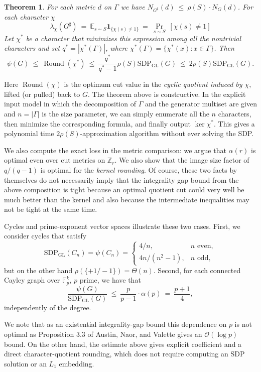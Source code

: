 \documentclass[11pt]{article}
\newtheorem{theorem}{Theorem}[section]
\theoremstyle{definition}
\theoremstyle{remark}
\newcommand{\E}{\mathbb{E}}
\newcommand{\Z}{\mathbb{Z}}
\newcommand{\one}{\mathbf{1}}
\newcommand{\roundval}{\operatorname{Round}}
\newcommand{\gl}{\operatorname{SDP_{GL}}}
\begin{document}
\begin{theorem}
\label{thm:intro-general}
For each metric $d$ on $\Gamma$ we have $N_{G^\sharp}(d) ~\leq~ \rho(S) \cdot N_G(d)$. For each character $\chi$ 
\[
  \lambda_\chi(G^\sharp)
  ~=~ \E_{s\sim S}
     \one_{\{\chi(s)\neq 1\}} ~=~ \Pr_{s \sim S}~[\chi(s) \neq 1] 
\]
Let $\chi^*$ be a character that minimizes this expression among all the nontrivial characters and set $q^*=|\chi^*(\Gamma)|$, where $\chi^*(\Gamma) = \{\chi^*(x): x \in \Gamma \}$. Then
\[
  \psi(G)
  ~\leq~ \roundval(\chi^*)
  ~\leq~ \frac{q^*}{q^*-1}\rho(S)\gl(G)
  ~\leq~ 2\rho(S)\gl(G).
\]
\end{theorem}

Here $\roundval(\chi)$ is the optimum cut value in the \emph{cyclic quotient induced by $\chi$}, lifted (or pulled) back to $G$. The theorem above is constructive. In the explicit input model in which the decomposition of $\Gamma$ and the generator multiset are given and $n=|\Gamma|$ is the size parameter, we can simply enumerate all the $n$ characters, then minimize the corresponding formula, and finally output $\ker\chi^*$. This gives a polynomial time $2\rho(S)$-approximation algorithm without ever solving the SDP. 


We also compute the exact loss in the metric comparison: we argue that $\alpha(r)$ is optimal even over cut metrics on $\Z_r$. We also show that the image size factor of $q/(q-1)$ is optimal for the  \emph{kernel rounding}. Of course, these two facts by themselves do not necessarily  imply that the integrality gap bound from the above composition is tight because an optimal quotient cut could very well be much better than the kernel and also because the intermediate inequalities may not be tight at the same time.

Cycles and prime-exponent vector spaces illustrate these two cases. First, we consider cycles that satisfy
\[
  \gl(C_n)=\psi(C_n)=
  \begin{cases}
    4/n,&n\text{ even},\\[2pt]
    4n/(n^2-1),&n\text{ odd},
  \end{cases}
\]
but on the other hand $\rho(\{+1/-1\}) = \Theta(n)$. 
Second, for each connected Cayley graph over $\mathbb{F}_p^k$, $p$ prime, we have that 
\[
  \frac{\psi(G)}{\gl(G)}
  ~\leq~ \frac{p}{p-1} \cdot \alpha(p)
  ~=~\frac{p +1}{4},
\]
independently of the degree. 

We note that as an existential integrality-gap bound this dependence on $p$ is not optimal as 
Proposition 3.3 of Austin, Naor, and Valette \cite{DBLP:journals/dcg/AustinNV10} gives an $\mathcal O (\log p)$ bound. On the other hand, the estimate above gives explicit coefficient and a direct character-quotient rounding, which does not require computing an SDP solution or an $L_1$ embedding.
\end{document}
